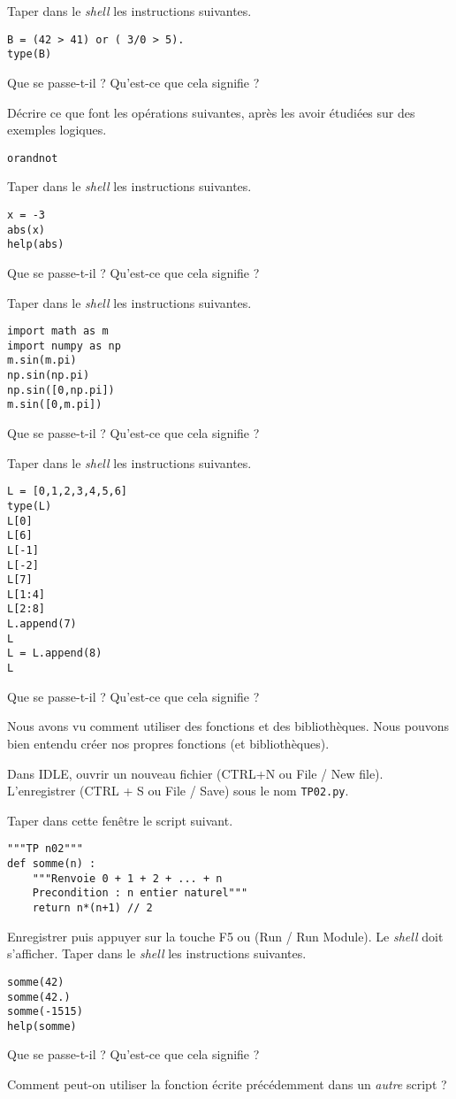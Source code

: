 \question{} Taper dans le \emph{shell} les instructions suivantes. 
\begin{verbatim}
B = (42 > 41) or ( 3/0 > 5).
type(B)
\end{verbatim}
Que se passe-t-il ? Qu'est-ce que cela signifie ?

\medskip{}

\question{} Décrire ce que font les opérations suivantes, après les avoir étudiées sur des exemples logiques.
\begin{center}
  \texttt{or}\qquad\texttt{and}\qquad\texttt{not}
\end{center}


\medskip{}

\question{} Taper dans le \emph{shell} les instructions suivantes. 
\begin{verbatim}
x = -3
abs(x)
help(abs)
\end{verbatim}
Que se passe-t-il ? Qu'est-ce que cela signifie ?

\medskip{}

\question{} Taper dans le \emph{shell} les instructions suivantes. 
\begin{verbatim}
import math as m
import numpy as np
m.sin(m.pi)
np.sin(np.pi)
np.sin([0,np.pi])
m.sin([0,m.pi])
\end{verbatim}
Que se passe-t-il ? Qu'est-ce que cela signifie ?


\medskip{}

\question{} Taper dans le \emph{shell} les instructions suivantes. 
\begin{verbatim}
L = [0,1,2,3,4,5,6]
type(L)
L[0]
L[6]
L[-1]
L[-2]
L[7]
L[1:4]
L[2:8]
L.append(7)
L
L = L.append(8)
L
\end{verbatim}
Que se passe-t-il ? Qu'est-ce que cela signifie ?

\medskip{}

Nous avons vu comment utiliser des fonctions et des bibliothèques. Nous pouvons bien entendu créer nos propres fonctions (et bibliothèques). 

Dans IDLE, ouvrir un nouveau fichier (CTRL+N ou File / New file). L'enregistrer (CTRL + S ou File / Save) sous le nom \texttt{TP02.py}. 

\medskip{}

\question{} Taper dans cette fenêtre le script suivant. 
\begin{lstlisting}
"""TP n02"""
def somme(n) : 
    """Renvoie 0 + 1 + 2 + ... + n
    Precondition : n entier naturel"""
    return n*(n+1) // 2 
\end{lstlisting}
Enregistrer puis appuyer sur la touche F5 ou (Run / Run Module).
Le \emph{shell} doit s'afficher. 
Taper dans le \emph{shell} les instructions suivantes. 
\begin{lstlisting}
somme(42)
somme(42.)
somme(-1515)
help(somme)
\end{lstlisting}
Que se passe-t-il ? Qu'est-ce que cela signifie ?

\medskip{}

\question{} Comment peut-on utiliser la fonction écrite précédemment dans un \emph{autre} script \python{} ? 